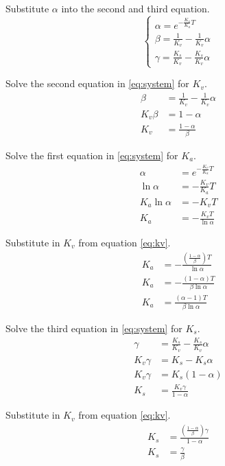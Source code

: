 \documentclass[10pt,conference,compsoc]{IEEEtran}
\begin{document}
Substitute $\alpha$ into the second and third equation.
\begin{equation}
  \begin{cases}
    \alpha = e^{-\frac{K_v}{K_a} T} \\
    \beta = \frac{1}{K_v} - \frac{1}{K_v}\alpha \\
    \gamma = \frac{K_s}{K_v} - \frac{K_s}{K_v}\alpha
  \end{cases} \label{eq:system}
\end{equation}

Solve the second equation in \eqref{eq:system} for $K_v$.
\begin{align}
  \beta &= \frac{1}{K_v} - \frac{1}{K_v}\alpha \nonumber \\
  K_v \beta &= 1 - \alpha \nonumber \\
  K_v &= \frac{1 - \alpha}{\beta} \label{eq:kv}
\end{align}

Solve the first equation in \eqref{eq:system} for $K_a$.
\begin{align*}
  \alpha &= e^{-\frac{K_v}{K_a} T} \\
  \ln\alpha &= -\frac{K_v}{K_a} T \\
  K_a \ln\alpha &= -K_v T \\
  K_a &= -\frac{K_v T}{\ln\alpha}
\end{align*}

Substitute in $K_v$ from equation \eqref{eq:kv}.
\begin{align}
  K_a &= -\frac{\left(\frac{1 - \alpha}{\beta}\right) T}{\ln\alpha} \nonumber \\
  K_a &= -\frac{(1 - \alpha) T}{\beta \ln\alpha} \nonumber \\
  K_a &= \frac{(\alpha - 1) T}{\beta \ln\alpha}
\end{align}

Solve the third equation in \eqref{eq:system} for $K_s$.
\begin{align*}
  \gamma &= \frac{K_s}{K_v} - \frac{K_s}{K_v} \alpha \\
  K_v \gamma &= K_s - K_s \alpha \\
  K_v \gamma &= K_s(1 - \alpha) \\
  K_s &= \frac{K_v \gamma}{1 - \alpha}
\end{align*}

Substitute in $K_v$ from equation \eqref{eq:kv}.
\begin{align}
  K_s &= \frac{\left(\frac{1 - \alpha}{\beta}\right) \gamma}{1 - \alpha}
    \nonumber \\
  K_s &= \frac{\gamma}{\beta}
\end{align}
\end{document}
